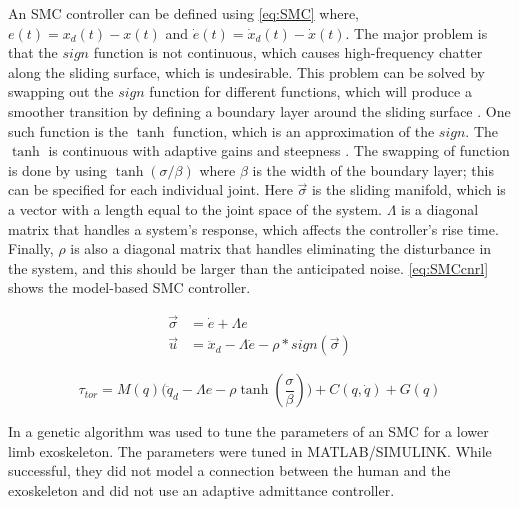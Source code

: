 An SMC controller can be defined using \autoref{eq:SMC} where, $e(t) = x_d(t) - x(t)$ and $\dot{e}(t) = \dot{x}_d(t) - \dot{x}(t)$. The major problem is that the $sign$ function is not continuous, which causes high-frequency chatter along the sliding surface, which is undesirable. This problem can be solved by swapping out the $sign$  function for different functions, which will produce a smoother transition by defining a boundary layer around the sliding surface \cite{babaiasl2015sliding}. One such function is the $\tanh$ function, which is an approximation of the $sign$. The $\tanh$ is continuous with adaptive gains and steepness \cite{aghababa2012chattering}. The swapping of function is done by using $\tanh(\sigma / \beta)$ where $\beta$ is the width of the boundary layer; this can be specified for each individual joint. Here $\vec{\sigma}$ is the sliding manifold, which is a vector with a length equal to the joint space of the system. $\Lambda$ is a diagonal matrix that handles a system's response, which affects the controller's rise time. Finally, $\rho$ is also a diagonal matrix that handles eliminating the disturbance in the system, and this should be larger than the anticipated noise.  \autoref{eq:SMCcnrl} shows the model-based SMC controller.

\begin{equation}
   \begin{aligned} 
        \vec{\sigma} &=  \dot{e}  + \Lambda e \\
        \vec{u} &= \ddot{x}_d - \Lambda \dot{e} - \rho * sign(\vec{\sigma})
    \end{aligned}
    \label{eq:SMC}
\end{equation}






\begin{equation}
        \tau_{tor} = M(q) \Big( \ddot{q}_d  - \Lambda e - \rho \tanh(\frac{\sigma}{\beta}) \Big) + C( q, \dot{q} ) + G(q) 
    \label{eq:SMCcnrl}
\end{equation}






In \cite{long2016robust} a genetic algorithm was used to tune the parameters of an SMC for a lower limb exoskeleton. The parameters were tuned in MATLAB/SIMULINK. While successful, they did not model a connection between the human and the exoskeleton and did not use an adaptive admittance controller. 

